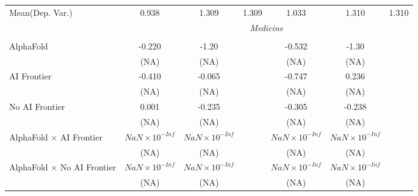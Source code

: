 \begin{tabular}{lcccccc}
Mean(Dep. Var.) & 0.938 & 1.309 & 1.309 & 1.033 & 1.310 & 1.310 \\
 & \multicolumn{6}{c}{\textit{Medicine}} \\ \\
   AlphaFold                                                                  & -0.220                 & -1.20                  &                        & -0.532                 & -1.30                  &   \\   
                                                                              & (NA)                   & (NA)                   &                        & (NA)                   & (NA)                   &   \\   
   AI Frontier                                                                & -0.410                 & -0.065                 &                        & -0.747                 & 0.236                  &   \\   
                                                                              & (NA)                   & (NA)                   &                        & (NA)                   & (NA)                   &   \\   
   No AI Frontier                                                             & 0.001                  & -0.235                 &                        & -0.305                 & -0.238                 &   \\   
                                                                              & (NA)                   & (NA)                   &                        & (NA)                   & (NA)                   &   \\   
   AlphaFold $\times$ AI Frontier                                             & $NaN\times 10^{-Inf}$  & $NaN\times 10^{-Inf}$  &                        & $NaN\times 10^{-Inf}$  & $NaN\times 10^{-Inf}$  &   \\   
                                                                              & (NA)                   & (NA)                   &                        & (NA)                   & (NA)                   &   \\   
   AlphaFold $\times$ No AI Frontier                                          & $NaN\times 10^{-Inf}$  & $NaN\times 10^{-Inf}$  &                        & $NaN\times 10^{-Inf}$  & $NaN\times 10^{-Inf}$  &   \\   
                                                                              & (NA)                   & (NA)                   &                        & (NA)                   & (NA)                   &   \\   

\end{tabular}
